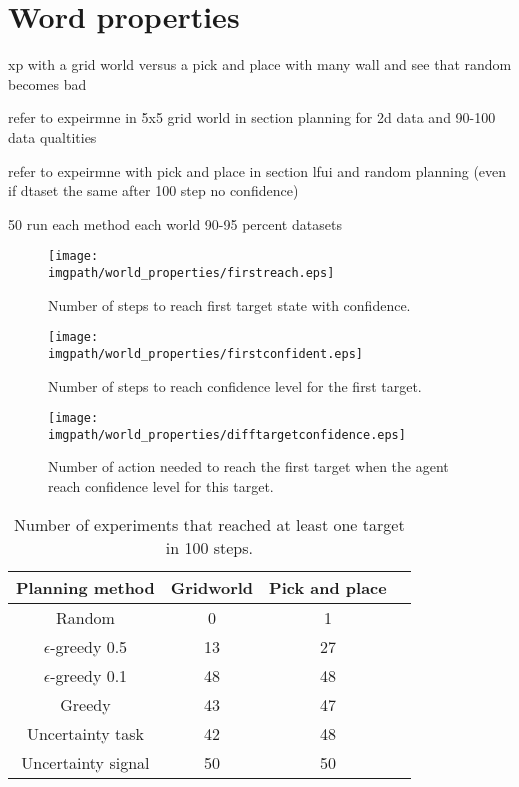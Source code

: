 
\section{Word properties}
\label{chapter:limitations:wordlproperties}



xp with a grid world versus a pick and place with many wall and see that random becomes bad

refer to expeirmne in 5x5 grid world in section planning for 2d data and 90-100 data qualtities

refer to expeirmne with pick and place in section lfui and random planning (even if dtaset the same after 100 step no confidence)

50 run each method each world
90-95 percent datasets


\begin{figure}[!ht]
\centering
\texttt{[image: \\imgpath/world\_properties/firstreach.eps]}
\caption{Number of steps to reach first target state with confidence.}
\label{fig:wordlpropertiestimefirst}
\end{figure} 



\begin{figure}[!ht]
\centering
\texttt{[image: \\imgpath/world\_properties/firstconfident.eps]}
\caption{Number of steps to reach confidence level for the first target.}
\label{fig:wordlpropertiesconfidencefirst}
\end{figure} 

\begin{figure}[!ht]
\centering
\texttt{[image: \\imgpath/world\_properties/difftargetconfidence.eps]}
\caption{Number of action needed to reach the first target when the agent reach confidence level for this target.}
\label{fig:wordlpropertiestargetdist}
\end{figure} 


\begin{table}[!ht]
\centering
{}
\begin{tabular}{c c c c}
    Planning method & Gridworld &  Pick and place \\ \hline
    Random & 0 & 1 \\ 
    $\epsilon$-greedy 0.5 & 13 & 27 \\
    $\epsilon$-greedy 0.1 & 48 & 48 \\
    Greedy & 43 & 47 \\
    Uncertainty task & 42 & 48 \\
    Uncertainty signal & 50 & 50 \\
\end{tabular}
\caption{Number of experiments that reached at least one target in 100 steps.}
\label{tab:}
\end{table}


